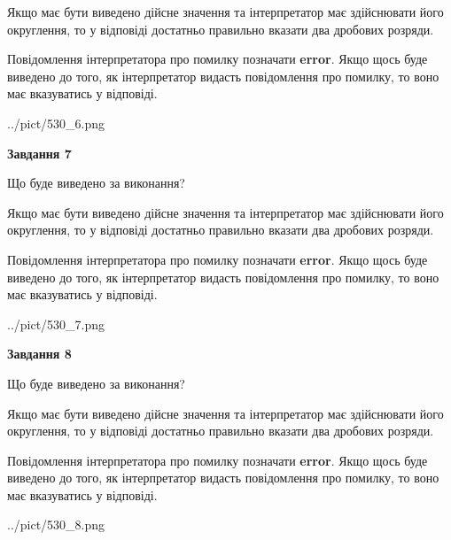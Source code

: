 \documentclass[12pt, ukrainian]{article}
\begin{document}
{\begin {Large}
Якщо має бути виведено дійсне значення та інтерпретатор має здійснювати його округлення, 
то у відповіді достатньо правильно вказати два дробових розряди.

Повідомлення інтерпретатора про помилку позначати \textbf{error}.
Якщо щось буде виведено до того, як інтерпретатор видасть повідомлення про помилку, 
то воно має вказуватись у відповіді. \par

\begin{center}
	{../pict/530_6.png}
\end{center}
\newpage

{\begin {center}\textbf{Завдання 7}\end {center}}\par
Що буде виведено за виконання? \par

Якщо має бути виведено дійсне значення та інтерпретатор має здійснювати його округлення, 
то у відповіді достатньо правильно вказати два дробових розряди.

Повідомлення інтерпретатора про помилку позначати \textbf{error}.
Якщо щось буде виведено до того, як інтерпретатор видасть повідомлення про помилку, 
то воно має вказуватись у відповіді. \par

\begin{center}
	{../pict/530_7.png}
\end{center}
\newpage

{\begin {center}\textbf{Завдання 8}\end {center}}\par
Що буде виведено за виконання? \par

Якщо має бути виведено дійсне значення та інтерпретатор має здійснювати його округлення, 
то у відповіді достатньо правильно вказати два дробових розряди.

Повідомлення інтерпретатора про помилку позначати \textbf{error}.
Якщо щось буде виведено до того, як інтерпретатор видасть повідомлення про помилку, 
то воно має вказуватись у відповіді. \par

\begin{center}
	{../pict/530_8.png}
\end{center}
\newpage


\end{Large}}
\end{document}
